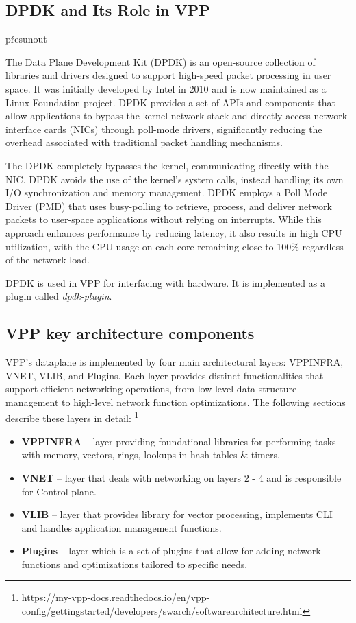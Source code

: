 \subsection{DPDK and Its Role in VPP}

přesunout

The Data Plane Development Kit (DPDK) is an open-source collection of libraries and drivers designed to support high-speed packet processing in user space. 
It was initially developed by Intel in 2010 and is now maintained as a Linux Foundation project. 
DPDK provides a set of APIs and components that allow applications to bypass the kernel network stack and directly access network interface cards (NICs) 
through poll-mode drivers, significantly reducing the overhead associated with traditional packet handling mechanisms.\cite{dpdk_about}

The DPDK completely bypasses the kernel, communicating directly with the NIC.
DPDK avoids the use of the kernel’s system calls, instead handling its own I/O synchronization and memory management. 
DPDK employs a Poll Mode Driver (PMD) that uses busy-polling to retrieve, process, and deliver network packets to user-space applications without relying on interrupts. 
While this approach enhances performance by reducing latency, it also results in high CPU utilization, with the CPU usage on each core remaining close to 100\% regardless of the network load.\cite{FREITAS2022148}

DPDK is used in VPP for interfacing with hardware. It is implemented as a plugin called \textit{dpdk-plugin}.\cite{LINGUAGLOSSA, DR:COMMAG-18} 

\subsection{VPP key architecture components}

VPP's dataplane is implemented by four main architectural layers: VPPINFRA, VNET, VLIB, and Plugins. 
Each layer provides distinct functionalities that support efficient networking operations, from low-level data structure management to high-level network function optimizations. 
The following sections describe these layers in detail: \footnote{https://my-vpp-docs.readthedocs.io/en/vpp-config/gettingstarted/developers/swarch/softwarearchitecture.html}

\begin{itemize}
  \item \textbf{VPPINFRA} -- layer providing foundational libraries for performing tasks with memory, vectors, rings, lookups in hash tables \& timers.
  \item \textbf{VNET} -- layer that deals with networking on layers 2 - 4 and is responsible for Control plane.
  \item \textbf{VLIB} -- layer that provides library for vector processing, implements CLI and handles application management functions.
  \item \textbf{Plugins} -- layer which is a set of plugins that allow for adding network functions and optimizations tailored to specific needs.
\end{itemize}

